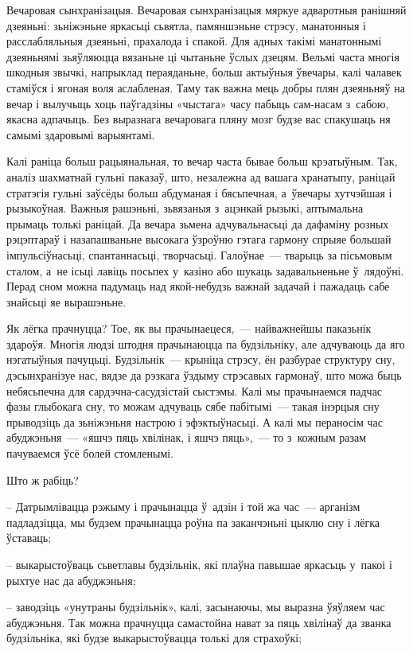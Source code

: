 Вечаровая сынхранізацыя. Вечаровая сынхранізацыя мяркуе адваротныя ранішняй дзеяньні: зьніжэньне яркасьці сьвятла, памяншэньне стрэсу, манатонныя і расслабляльныя дзеяньні, прахалода і спакой. Для адных такімі манатоннымі дзеяньнямі зьяўляюцца вязаньне ці чытаньне ўслых дзецям. Вельмі часта многія шкодныя звычкі, напрыклад пераяданьне, больш актыўныя ўвечары, калі чалавек стаміўся і ягоная воля аслабленая. Таму так важна мець добры плян дзеяньняў на вечар і вылучыць хоць паўгадзіны «чыстага» часу пабыць сам-насам з~сабою, якасна адпачыць. Без выразнага вечаровага пляну мозг будзе вас спакушаць ня самымі здаровымі варыянтамі.

Калі раніца больш рацыянальная, то вечар часта бывае больш крэатыўным. Так, аналіз шахматнай гульні паказаў, што, незалежна ад вашага хранатыпу, раніцай стратэгія гульні заўсёды больш абдуманая і бясьпечная, а~ўвечары хутчэйшая і рызыкоўная. Важныя рашэньні, зьвязаныя з~ацэнкай рызыкі, аптымальна прымаць толькі раніцай. Да вечара зьмена адчувальнасьці да дафаміну розных рэцэптараў і назапашваньне высокага ўзроўню гэтага гармону спрыяе большай імпульсіўнасьці, спантаннасьці, творчасьці. Галоўнае~--- тварыць за пісьмовым сталом, а~не ісьці лавіць посьпех у~казіно або шукаць задавальненьне ў~лядоўні. Перад сном можна падумаць над якой-небудзь важнай задачай і пажадаць сабе знайсьці яе вырашэньне.

Як лёгка прачнуцца? Тое, як вы прачынаецеся,~--- найважнейшы паказьнік здароўя. Многія людзі штодня прачынаюцца па будзільніку, але адчуваюць да яго нэгатыўныя пачуцьці. Будзільнік~--- крыніца стрэсу, ён разбурае структуру сну, дэсынхранізуе нас, вядзе да рэзкага ўздыму стрэсавых гармонаў, што можа быць небясьпечна для сардэчна-сасудзістай сыстэмы. Калі мы прачынаемся падчас фазы глыбокага сну, то можам адчуваць сябе пабітымі~--- такая інэрцыя сну прыводзіць да зьніжэньня настрою і эфэктыўнасьці. А калі мы пераносім час абуджэньня~--- «яшчэ пяць хвілінак, і яшчэ пяць»,~--- то з~кожным разам пачуваемся ўсё болей стомленымі.

Што ж рабіць? 

– Датрымлівацца рэжыму і прачынацца ў~адзін і той жа час~--- арганізм падладзіцца, мы будзем прачынацца роўна па заканчэньні цыклю сну і лёгка ўставаць;

– выкарыстоўваць сьветлавы будзільнік, які плаўна павышае яркасьць у~пакоі і рыхтуе нас да абуджэньня;

– заводзіць «унутраны будзільнік», калі, засынаючы, мы выразна ўяўляем час абуджэньня. Так можна прачнуцца самастойна нават за пяць хвілінаў да званка будзільніка, які будзе выкарыстоўвацца толькі для страхоўкі;

